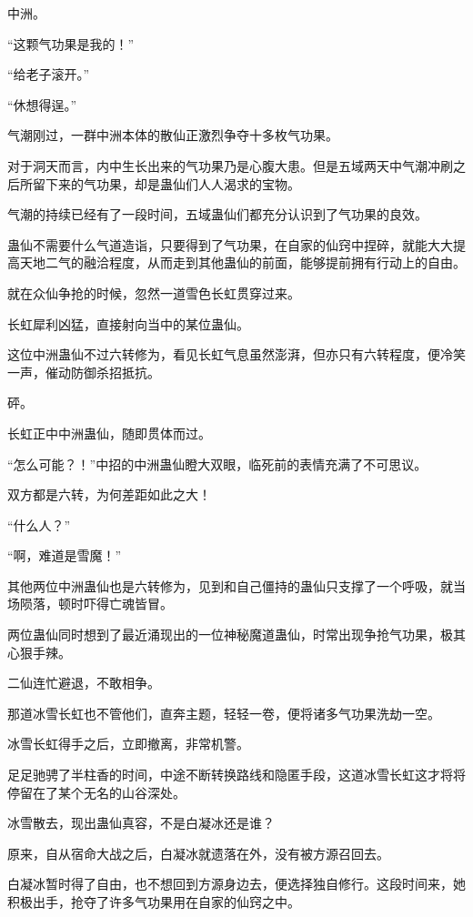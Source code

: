 
\begin{this_body}

中洲。

“这颗气功果是我的！”

“给老子滚开。”

“休想得逞。”

气潮刚过，一群中洲本体的散仙正激烈争夺十多枚气功果。

对于洞天而言，内中生长出来的气功果乃是心腹大患。但是五域两天中气潮冲刷之后所留下来的气功果，却是蛊仙们人人渴求的宝物。

气潮的持续已经有了一段时间，五域蛊仙们都充分认识到了气功果的良效。

蛊仙不需要什么气道造诣，只要得到了气功果，在自家的仙窍中捏碎，就能大大提高天地二气的融洽程度，从而走到其他蛊仙的前面，能够提前拥有行动上的自由。

就在众仙争抢的时候，忽然一道雪色长虹贯穿过来。

长虹犀利凶猛，直接射向当中的某位蛊仙。

这位中洲蛊仙不过六转修为，看见长虹气息虽然澎湃，但亦只有六转程度，便冷笑一声，催动防御杀招抵抗。

砰。

长虹正中中洲蛊仙，随即贯体而过。

“怎么可能？！”中招的中洲蛊仙瞪大双眼，临死前的表情充满了不可思议。

双方都是六转，为何差距如此之大！

“什么人？”

“啊，难道是雪魔！”

其他两位中洲蛊仙也是六转修为，见到和自己僵持的蛊仙只支撑了一个呼吸，就当场陨落，顿时吓得亡魂皆冒。

两位蛊仙同时想到了最近涌现出的一位神秘魔道蛊仙，时常出现争抢气功果，极其心狠手辣。

二仙连忙避退，不敢相争。

那道冰雪长虹也不管他们，直奔主题，轻轻一卷，便将诸多气功果洗劫一空。

冰雪长虹得手之后，立即撤离，非常机警。

足足驰骋了半柱香的时间，中途不断转换路线和隐匿手段，这道冰雪长虹这才将将停留在了某个无名的山谷深处。

冰雪散去，现出蛊仙真容，不是白凝冰还是谁？

原来，自从宿命大战之后，白凝冰就遗落在外，没有被方源召回去。

白凝冰暂时得了自由，也不想回到方源身边去，便选择独自修行。这段时间来，她积极出手，抢夺了许多气功果用在自家的仙窍之中。


\end{this_body}
